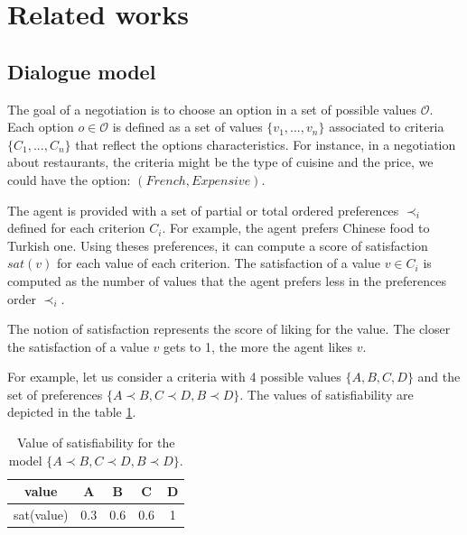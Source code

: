 \documentclass[sigconf]{aamas}  %
\begin{document}
	
	\section{Related works}
	
	\subsection{Dialogue model}
	\label{sec:dialogue-model}
	
	The goal of a negotiation is to choose an option in a set of possible values $\mathcal{O}$. Each option $o\in\mathcal{O}$ is defined as a set of values $\{v_1, ..., v_n\}$ associated to criteria $\{C_1, ..., C_n\}$ that reflect the options characteristics.  For instance, in a negotiation about restaurants, the criteria might be the type of cuisine and the price, we could have the option: $(French,Expensive)$.
	
	The agent is provided with a set of partial or total ordered preferences $\prec_i$ defined for each criterion $C_i$. For example, the agent prefers Chinese food to Turkish one. Using theses preferences, it can compute a score of satisfaction $sat(v)$ for each value of each criterion. The satisfaction of a value $v \in C_i$ is computed as the number of values that the agent prefers less in the preferences order $\prec_i$.
	
	The notion of satisfaction represents the score of liking for the value. The closer the satisfaction of a value $v$ gets to 1, the more the agent likes $v$.
	
	\par For example, let us consider a criteria with 4 possible values $\{A, B, C, D\}$ and the set of preferences $\{A \prec B, C \prec D , B \prec D \}$. The values of satisfiability are depicted in the table \ref{tab:sat}.
	\begin{table}
		\centering
		\begin{tabular}{ |c|c|c|c|c| }
			\hline				
			value & A & B & C & D \\
			\hline
			
			\hline
			sat(value) & 0.3 & 0.6 & 0.6 & 1 \\
			\hline
			
		\end{tabular}
		\caption{Value of satisfiability for the model $\{A \prec B, C \prec D , B \prec D \}$.}
		\label{tab:sat}
	\end{table}
	
\end{document}

